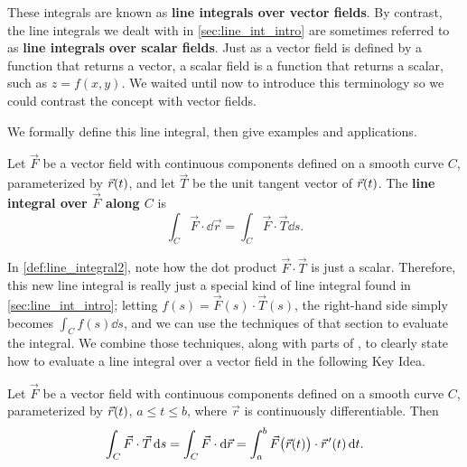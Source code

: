 These integrals are known as \textbf{line integrals over vector fields}. By contrast, the line integrals we dealt with in \autoref{sec:line_int_intro} are sometimes referred to as \textbf{line integrals over scalar fields}. Just as a vector field is defined by a function that returns a vector, a scalar field is a function that returns a scalar, such as $z = f(x,y)$. We waited until now to introduce this terminology so we could contrast the concept with vector fields. 

We formally define this line integral, then give examples and applications.

\begin{definition}\label{def:line_integral2}%
Let $\vec F$ be a vector field with continuous components defined on a smooth curve $C$, parameterized by $\vec r(t)$, and let $\vec T$ be the unit tangent vector of $\vec r(t)$. The \textbf{line integral over $\vec F$ along $C$} is
\[\int_C \vec F\cdot\dd\vec r = \int_C \vec F\cdot\vec T\dd s.\]
\end{definition}


In \autoref{def:line_integral2}, note how the dot product $\vec F \cdot \vec T$ is just a scalar. %
Therefore, this new line integral is really just a special kind of line integral found in \autoref{sec:line_int_intro}; letting $f(s) = \vec F(s)\cdot \vec T(s)$, the right-hand side simply becomes $\int_C f(s)\dd s$, and we can use the techniques of that section to evaluate the integral. We combine those techniques, along with parts of , to clearly state how to evaluate a line integral over a vector field in the following Key Idea. 

\begin{keyidea}\label{idea:line2}%
Let $\vec F$ be a vector field with continuous components defined on a smooth curve $C$, parameterized by $\vec r(t)$, $a\leq t\leq b$, where $\vec r$ is continuously differentiable. Then
	\[
	\int_C\vec F\cdot\vec T\operatorname{d}\! s = \int_C \vec F\cdot\operatorname{d}\!\vec r
	=\int_a^b \vec F\bigl(\vec r(t)\bigr) \cdot \vec r\hskip1.25pt '(t)\operatorname{d}\! t.
	\]
\end{keyidea}


